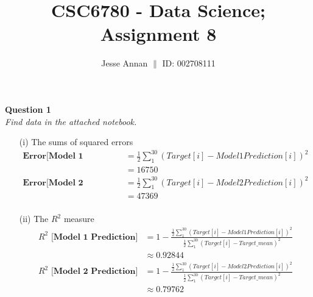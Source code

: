\documentclass[10pt,a4paper]{article}
\title{CSC6780 - Data Science; Assignment 8}
\author{Jesse Annan \hspace{0.5cm} $\|$ \hspace{0.5cm} ID: 002708111}
\begin{document}
	\maketitle
	
	\clearpage
	
	\textbf{Question 1} \newline \\ \textit{Find data in the attached notebook.}
		\begin{enumerate}
			\item[(i)] The sums of squared errors
				\begin{equation*}
					\begin{split}
						\textbf{Error[Model 1 Prediction]} & = \frac{1}{2} \sum_{1}^{30} (Target[i] - Model1 Prediction[i]) ^ 2 \\
						& = 16750 \\
						\textbf{Error[Model 2 Prediction]} & = \frac{1}{2} \sum_{1}^{30} (Target[i] - Model2 Prediction[i]) ^ 2 \\
						& = 47369 \\
					\end{split}
				\end{equation*}
			
			\item[(ii)] The $R^2$ measure
				\begin{equation*}
					\begin{split}
						\textbf{$R^2$ [Model 1 Prediction]} & = 1 - \frac{ \frac{1}{2} \sum_{1}^{30} (Target[i] - Model1 Prediction[i]) ^ 2 }{ \frac{1}{2} \sum_{1}^{30} (Target[i] - Target\_mean) ^ 2 }  \\
						& \approx 0.92844 \\
						\textbf{$R^2$ [Model 2 Prediction]} & = 1 - \frac{ \frac{1}{2} \sum_{1}^{30} (Target[i] - Model2 Prediction[i]) ^ 2 }{ \frac{1}{2} \sum_{1}^{30} (Target[i] - Target\_mean) ^ 2 }  \\
						& \approx 0.79762
					\end{split}
				\end{equation*}
		\end{enumerate}
	
	\newpage
	
\end{document}

